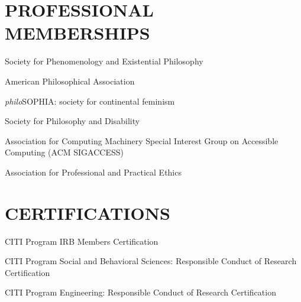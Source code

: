 \documentclass{article}
\newcommand{\listitemspace}{0.25em}
\renewenvironment{itemize}
{\begin{list}{}{\setlength{\leftmargin}{0em}
                \setlength{\parskip}{0em}
                \setlength{\itemsep}{\listitemspace}
                \setlength{\parsep}{\listitemspace}}}
{\end{list}}
\begin{document}
\section*{\normalsize{PROFESSIONAL MEMBERSHIPS}}
\begin{itemize}
    \item Society for Phenomenology and Existential Philosophy
    \item American Philosophical Association
    \item \textit{philo}SOPHIA: society for continental feminism
    \item Society for Philosophy and Disability
    \item Association for Computing Machinery \textemdash{} Special Interest Group on Accessible Computing (ACM SIGACCESS)
    \item Association for Professional and Practical Ethics
\end{itemize}

\section*{\normalsize{CERTIFICATIONS}}
\begin{itemize}
    \item CITI Program IRB Members Certification
    \item CITI Program Social and Behavioral Sciences: Responsible Conduct of Research Certification
    \item CITI Program Engineering: Responsible Conduct of Research Certification
\end{itemize}
\end{document}
